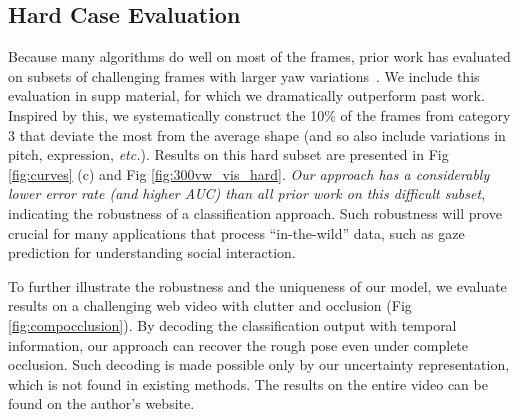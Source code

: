 \documentclass[letterpaper]{article} %
\newcommand{\etc}{\textit{etc.}}
\begin{document}
\subsection{Hard Case Evaluation}
Because many algorithms do well on most of the frames, prior work has evaluated on subsets of challenging frames with larger yaw variations~\cite{Zhu2016FaceAA}. We include this evaluation in supp material, for which we dramatically outperform past work. Inspired by this, we systematically construct the 10\% of the frames from category 3 that deviate the most from the average shape (and so also include variations in pitch, expression, \etc). Results on this hard subset are presented in Fig \ref{fig:curves} (c) and Fig \ref{fig:300vw_vis_hard}. {\em Our approach has a considerably lower error rate (and higher AUC) than all prior work on this difficult subset}, indicating the robustness of a classification approach. Such robustness will prove crucial for many applications that process ``in-the-wild'' data, such as gaze prediction for understanding social interaction.

To further illustrate the robustness and the uniqueness of our model, we evaluate results on a challenging web video with clutter and occlusion (Fig \ref{fig:compocclusion}). By decoding the classification output with temporal information, our approach can recover the rough pose even under complete occlusion. Such decoding is made possible only by our uncertainty representation, which is not found in existing methods.
The results on the entire video can be found on the author's website.
\end{document}
